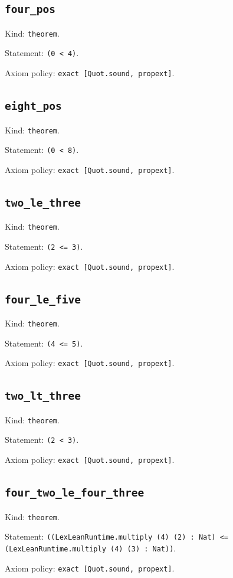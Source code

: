 \documentclass[11pt]{article}
\begin{document}
\subsection*{\texttt{four\_pos}}
\noindent Kind: \texttt{theorem}.\par
\noindent Statement: \texttt{(0 < 4)}.\par
\noindent Axiom policy: \texttt{exact [Quot.sound, propext]}.\par
\subsection*{\texttt{eight\_pos}}
\noindent Kind: \texttt{theorem}.\par
\noindent Statement: \texttt{(0 < 8)}.\par
\noindent Axiom policy: \texttt{exact [Quot.sound, propext]}.\par
\subsection*{\texttt{two\_le\_three}}
\noindent Kind: \texttt{theorem}.\par
\noindent Statement: \texttt{(2 <= 3)}.\par
\noindent Axiom policy: \texttt{exact [Quot.sound, propext]}.\par
\subsection*{\texttt{four\_le\_five}}
\noindent Kind: \texttt{theorem}.\par
\noindent Statement: \texttt{(4 <= 5)}.\par
\noindent Axiom policy: \texttt{exact [Quot.sound, propext]}.\par
\subsection*{\texttt{two\_lt\_three}}
\noindent Kind: \texttt{theorem}.\par
\noindent Statement: \texttt{(2 < 3)}.\par
\noindent Axiom policy: \texttt{exact [Quot.sound, propext]}.\par
\subsection*{\texttt{four\_two\_le\_four\_three}}
\noindent Kind: \texttt{theorem}.\par
\noindent Statement: \texttt{((LexLeanRuntime.multiply (4) (2) : Nat) <= (LexLeanRuntime.multiply (4) (3) : Nat))}.\par
\noindent Axiom policy: \texttt{exact [Quot.sound, propext]}.\par
\end{document}
